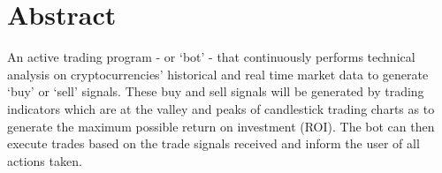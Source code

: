 %

%
\chapter*{Abstract}
\label{sec:abstract}
\thispagestyle{empty}

An active trading program - or `bot' - that continuously performs technical analysis on cryptocurrencies' historical and real time market data to generate `buy' or `sell' signals. These buy and sell signals will be generated by trading indicators which are at the valley and peaks of candlestick trading charts as to generate the maximum possible return on investment (ROI). The bot can then execute trades based on the trade signals received and inform the user of all actions taken.

\newpage





